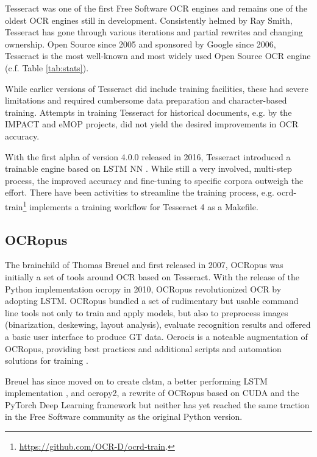 \documentclass[sigconf]{acmart}
\begin{document}
Tesseract \cite{4376991} was one of the first Free Software OCR
engines \cite{Rice1995TheFA} and remains one of the oldest OCR engines still in
development. Consistently helmed by Ray Smith, Tesseract has gone
through various iterations and partial rewrites and changing
ownership. Open Source since 2005 and sponsored by Google since
2006, Tesseract is the most well-known and most widely used Open
Source OCR engine (c.f. Table \ref{tab:stats}).

While earlier versions of Tesseract did include training facilities, 
these had severe limitations and required cumbersome data preparation and
character-based training. Attempts in training Tesseract for historical documents, e.g.
by the IMPACT \cite{PSNC} and eMOP \cite{doi:10.1093/llc/fqv062} projects, did not yield 
the desired improvements in OCR accuracy.

With the first alpha of version 4.0.0 released in 2016, Tesseract introduced a trainable
engine based on LSTM NN \cite{smith2016tesseract}. While still a very involved, multi-step process, the
improved accuracy and fine-tuning to specific corpora outweigh the effort.
There have been activities to streamline the training process, e.g.
ocrd-train\footnote{\url{https://github.com/OCR-D/ocrd-train}.} implements a training workflow for
Tesseract 4 as a Makefile.

\subsection{OCRopus}

The brainchild of Thomas Breuel and first released in 2007, OCRopus
\cite{breuel} was initially a set of tools around OCR based on
Tesseract. With the release of the Python implementation ocropy in
2010, OCRopus revolutionized OCR by adopting LSTM. OCRopus bundled a set of rudimentary but
usable command line tools not only to train and apply models, but
also to preprocess images (binarization, deskewing, layout analysis),
evaluate recognition results and offered a basic user interface to produce
GT data. Ocrocis is a noteable augmentation of OCRopus, providing best practices and
additional scripts and automation solutions for training \cite{springmann2015ocrocis}.

Breuel has since moved on to create clstm, a better
performing LSTM implementation \cite{DBLP:conf/icdar/Breuel17}, and
ocropy2, a rewrite of OCRopus based on CUDA and the PyTorch Deep
Learning framework \cite{DBLP:conf/icdar/Breuel17} but neither has
yet reached the same traction in the Free Software community as the
original Python version.
\end{document}
